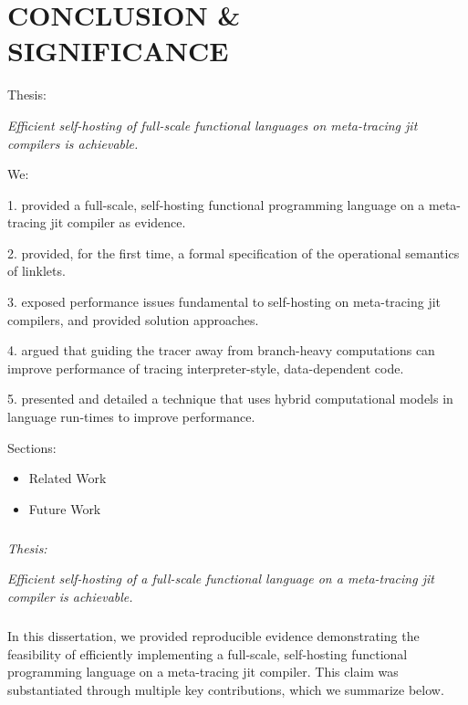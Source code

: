 \chapter[\texorpdfstring{CONCLUSION \& SIGNIFICANCE}
                          {8. Conclusion}]{CONCLUSION \& SIGNIFICANCE}

    \label{chapter:conclusion}

    \begin{chaptersynopsis}
        \footnotesize

        Thesis:

        \textit{Efficient self-hosting of full-scale functional languages on meta-tracing \gls{jit} compilers is achievable.}

        We:

        1. provided a full-scale, self-hosting functional programming language on a meta-tracing \gls{jit} compiler as evidence.

        2. provided, for the first time, a formal specification of the operational semantics of linklets.

        3. exposed performance issues fundamental to self-hosting on meta-tracing \gls{jit} compilers, and provided solution approaches.

        4. argued that guiding the tracer away from branch-heavy computations can improve performance of tracing interpreter-style, data-dependent code.

        5. presented and detailed a technique that uses hybrid computational models in language run-times to improve performance.

        \vspace{2em}

        Sections:
		\begin{itemize}
			\item Related Work
			\item Future Work
		\end{itemize}
    \end{chaptersynopsis}

    \paragraph{} \textit{Thesis:}

    \textit{Efficient self-hosting of a full-scale functional language on a meta-tracing \gls{jit} compiler is achievable.}

    \paragraph{}%
        In this dissertation, we provided reproducible evidence demonstrating the feasibility of efficiently implementing a full-scale, self-hosting functional programming language on a meta-tracing \gls{jit} compiler. This claim was substantiated through multiple key contributions, which we summarize below.

